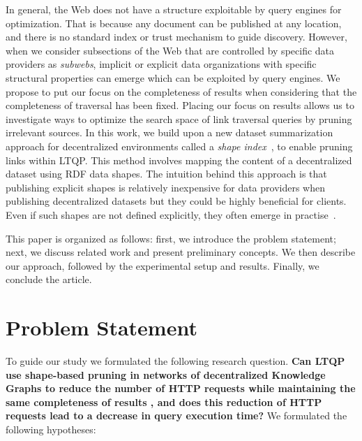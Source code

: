 In general, the Web does not have a structure exploitable by query engines for optimization.
That is because any document can be published at any location, and there is no standard index or trust mechanism to guide discovery.
However, when we consider subsections of the Web that are controlled by specific data providers as \emph{subwebs},
implicit or explicit data organizations with specific structural properties can emerge
which can be exploited by query engines.
We propose to put our focus on the completeness of results when considering that the completeness of traversal has been fixed.
Placing our focus on results allows us to investigate ways to optimize the search space of link traversal queries by pruning irrelevant sources.
In this work, we build upon a new dataset summarization approach for decentralized environments called a \emph{shape index}~\cite{tam2024opportunitiesshapebasedoptimizationlink},
to enable pruning links within LTQP.
This method involves mapping the content of a decentralized dataset using RDF data shapes.
The intuition behind this approach is that publishing explicit shapes is relatively inexpensive for data providers when publishing decentralized datasets but they could be highly beneficial for clients.
Even if such shapes are not defined explicitly, they often emerge in practise~\cite{Neumann2011CharacteristicSA}.

This paper is organized as follows: first, we introduce the problem statement; next, we discuss related work and present preliminary concepts.
We then describe our approach, followed by the experimental setup and results.
Finally, we conclude the article.

\section{Problem Statement}
To guide our study we formulated the following research question.
\textbf{Can LTQP use shape-based pruning in networks of decentralized Knowledge Graphs to reduce the number of HTTP requests while maintaining the same completeness of results , and does this reduction of HTTP requests lead to a decrease in query execution time?}
We formulated the following hypotheses:
\setcounter{hypothesisCounter}{1}

